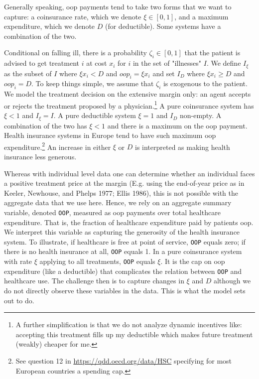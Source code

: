 \documentclass[a4paper,12pt]{article}
\makeatletter
\newcommand{\citeprocitem}[2]{\hyper@linkstart{cite}{citeproc_bib_item_#1}#2\hyper@linkend}
\makeatother
\begin{document}
Generally speaking, oop payments tend to take two forms that we want to capture: a coinsurance rate, which we denote \(\xi \in [0,1]\), and a maximum expenditure, which we denote \(D\) (for deductible). Some systems have a combination of the two.

Conditional on falling ill, there is a probability \(\zeta_i \in [0,1]\) that the patient is advised to get treatment \(i\) at cost \(x_i\) for \(i\) in the set of "illnesses" \(I\). We define \(I_{\xi}\) as the subset of \(I\) where \(\xi x_i < D\) and \(oop_i = \xi x_i\) and set \(I_D\) where \(\xi x_i \geq D\) and \(oop_i = D\). To keep things simple, we assume that \(\zeta_i\) is exogenous to the patient. We model the treatment decision on the extensive margin only: an agent accepts or rejects the treatment proposed by a physician.\footnote{A further simplification is that we do not analyze dynamic incentives like: accepting this treatment fills up my deductible which makes future treatment (weakly) cheaper for me.} A pure coinsurance system has \(\xi < 1\) and \(I_{\xi}=I\). A pure deductible system \(\xi=1\) and \(I_D\) non-empty. A combination of the two has \(\xi<1\) and there is a maximum on the oop payment. Health insurance systems in Europe tend to have such maximum oop expenditure.\footnote{See question 12 in \url{https://qdd.oecd.org/data/HSC} specifying for most European countries a spending cap.} An increase in either \(\xi\) or \(D\) is interpreted as making health insurance less generous.

Whereas with individual level data one can determine whether an individual faces a positive treatment price at the margin (E.g. using the end-of-year price as in \citeprocitem{15}{Keeler, Newhouse, and Phelps 1977}; \citeprocitem{11}{Ellis 1986}), this is not possible with the aggregate data that we use here. Hence, we rely on an aggregate summary variable, denoted \texttt{OOP}, measured as oop payments over total healthcare expenditure. That is, the fraction of healthcare expenditure paid by patients oop. We interpret this variable as capturing the generosity of the health insurance system. To illustrate, if healthcare is free at point of service, \texttt{OOP} equals zero; if there is no health insurance at all, \texttt{OOP} equals 1. In a pure coinsurance system with rate \(\xi\) applying to all treatments, \texttt{OOP} equals \(\xi\). It is the cap on oop expenditure (like a deductible) that complicates the relation between \texttt{OOP} and healthcare use. The challenge then is to capture changes in \(\xi\) and \(D\) although we do not directly observe these variables in the data. This is what the model sets out to do.
\end{document}
